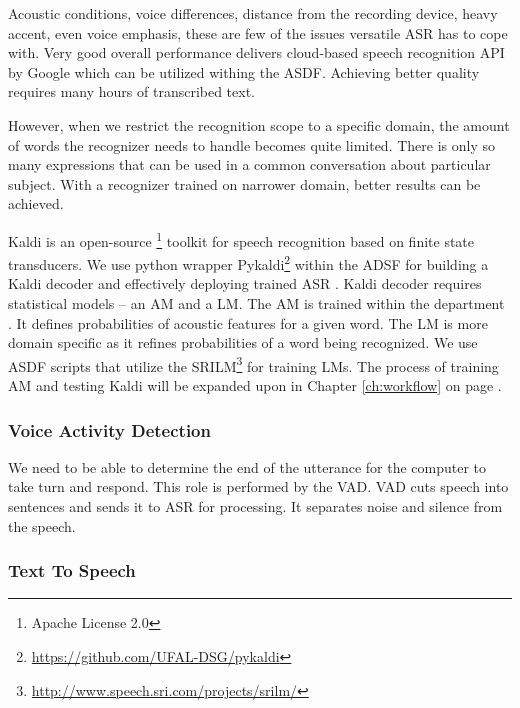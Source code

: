 Acoustic conditions, voice differences, distance from the recording device, heavy accent, even voice emphasis, these are few of the issues versatile \ac{ASR} has to cope with.
Very good overall performance delivers cloud-based speech recognition \acf{API} by Google which can be utilized withing the \ac{ASDF}.
Achieving better quality requires many hours of transcribed text.

However, when we restrict the recognition scope to a specific domain, the amount of words the recognizer needs to handle becomes quite limited.
There is only so many expressions that can be used in a common conversation about particular subject.
With a recognizer trained on narrower domain, better results can be achieved.


Kaldi is an open-source \footnote{Apache License 2.0} toolkit for speech recognition based on finite state transducers.
We use python wrapper Pykaldi\footnote{\url{https://github.com/UFAL-DSG/pykaldi}} within the ADSF for building a Kaldi decoder and effectively deploying trained \ac{ASR} \cite{oplatek}.
Kaldi decoder requires statistical models -- an \acf{AM} and a \acf{LM}.
The \ac{AM} is trained within the department \cite{oplatek_thesis}.
It defines probabilities of acoustic features for a given word.
The \ac{LM} is more domain specific as it refines probabilities of a word being recognized.
We use \ac{ASDF} 
scripts that utilize the \acf{SRILM}\footnote{\url{http://www.speech.sri.com/projects/srilm/}} for training \acp{LM}.
The process of training \ac{AM} and testing Kaldi will be expanded upon in Chapter \ref{ch:workflow} on page \pageref{ch:workflow}.

\subsubsection{Voice Activity Detection}

We need to be able to determine the end of the utterance for the computer to take turn and respond.
This role is performed by the \acf{VAD}.
\ac{VAD} cuts speech into sentences and sends it to \ac{ASR} for processing.
It separates noise and silence from the speech.

\subsubsection{Text To Speech}

